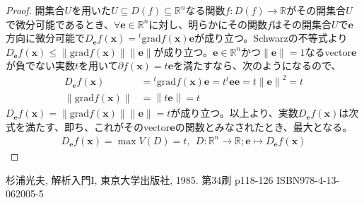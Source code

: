 \documentclass[dvipdfmx]{jsarticle}
\begin{document}
\begin{proof}
開集合$U$を用いた$U \subseteq D(f) \subseteq \mathbb{R}^{n}$なる関数$f:D(f) \rightarrow \mathbb{R}$がその開集合$U$で微分可能であるとき、$\forall\mathbf{e} \in \mathbb{R}^{n}$に対し、明らかにその関数$f$はその開集合$U$で$\mathbf{e}$方向に微分可能で$D_{\mathbf{e}}f\left( \mathbf{x} \right) ={}^{t}\mathrm{grad}f\left( \mathbf{x} \right)\mathbf{e}$が成り立つ。Schwarzの不等式より$D_{\mathbf{e}}f\left( \mathbf{x} \right) \leq \left\| \mathrm{grad}f\left( \mathbf{x} \right) \right\|\left\| \mathbf{e} \right\|$が成り立つ。$\mathbf{e} \in \mathbb{R}^{n}$かつ$\left\| \mathbf{e} \right\| = 1$なるvector$\mathbf{e}$が負でない実数$t$を用いて$\partial f\left( \mathbf{x} \right) = t\mathbf{e}$を満たすなら、次のようになるので、
\begin{align*}
D_{\mathbf{e}}f\left( \mathbf{x} \right) &={}^{t}\mathrm{grad}f\left( \mathbf{x} \right)\mathbf{e} = t{}^{t}\mathbf{ee} = t\left\| \mathbf{e} \right\|^{2} = t\\
\left\| \mathrm{grad}f\left( \mathbf{x} \right) \right\| &= \left\| t\mathbf{e} \right\| = t
\end{align*}
$D_{\mathbf{e}}f\left( \mathbf{x} \right) = \left\| \mathrm{grad}f\left( \mathbf{x} \right) \right\|\left\| \mathbf{e} \right\| = t$が成り立つ。以上より、実数$D_{\mathbf{e}}f\left( \mathbf{x} \right)$は次式を満たす、即ち、これがそのvector$\mathbf{e}$の関数とみなされたとき、最大となる。
\begin{align*}
D_{\mathbf{e}}f\left( \mathbf{x} \right) = \max{V(D)} = t,\ \ D:\mathbb{R}^{n} \rightarrow \mathbb{R};\mathbf{e} \mapsto D_{\mathbf{e}}f\left( \mathbf{x} \right)
\end{align*}
\end{proof}
\begin{thebibliography}{50}
  杉浦光夫, 解析入門I, 東京大学出版社, 1985. 第34刷 p118-126 ISBN978-4-13-062005-5
\end{thebibliography}
\end{document}
